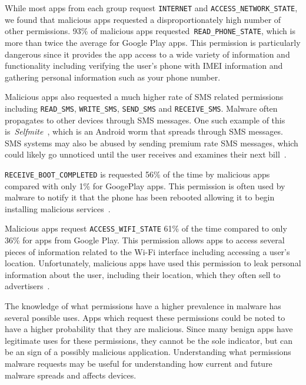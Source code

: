 \documentclass{sig-alternate}
\begin{document}
While most apps from each group request \texttt{INTERNET} and \newline \texttt{ACCESS\_NETWORK\_STATE},  we found that malicious apps requested a disproportionately high number of other permissions. 93\% of malicious apps requested~\texttt{READ\_PHONE\_STATE}, which is more than twice the average for Google Play apps. This permission is particularly dangerous since it provides the app access to a wide variety of information and functionality including verifying the user's phone with IMEI information and gathering personal information such as your phone number.

Malicious apps also requested a much higher rate of SMS related permissions including \texttt{READ\_SMS}, \texttt{WRITE\_SMS}, \texttt{SEND\_SMS} and \texttt{RECEIVE\_SMS}. Malware often propagates to other devices through SMS messages. One such example of this is~\emph{Selfmite}~\cite{zorz_zeljka_aggressive_2014}, which is an Android worm that spreads through SMS messages. SMS systems may also be abused by sending premium rate SMS messages, which could likely go unnoticed until the user receives and examines their next bill~\cite{felt2011survey}.


\texttt{RECEIVE\_BOOT\_COMPLETED} is requested 56\% of the time by malicious apps compared with only 1\% for GoogePlay apps. This permission is often used by malware to notify it that the phone has been rebooted allowing it to begin installing malicious services~\cite{canfora2013classifier}.

Malicious apps request \texttt{ACCESS\_WIFI\_STATE} 61\% of the time compared to only 36\% for apps from Google Play. This permission allows apps to access several pieces of information related to the Wi-Fi interface including accessing a user's location. Unfortunately, malicious apps have used this permission to leak personal information about the user, including their location, which they often sell to advertisers~\cite{achara2014wifileaks}.

The knowledge of what permissions have a higher prevalence in malware has several possible uses. Apps which request these permissions could be noted to have a higher probability that they are malicious. Since many benign apps have legitimate uses for these permissions, they cannot be the sole indicator, but can be an sign of a possibly malicious application. Understanding what permissions malware requests may be useful for understanding how current and future malware spreads and affects devices.
\end{document}
